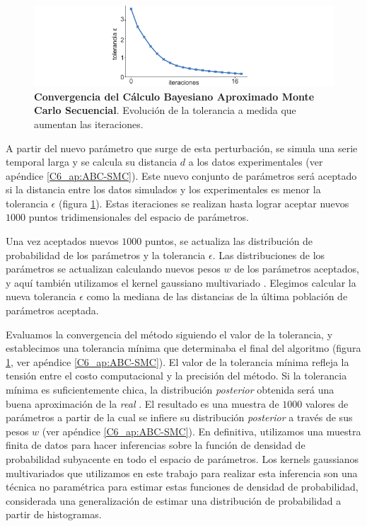 \documentclass[./main.tex]{subfiles}
\begin{document}
\begin{figure}
    \centering
    \includegraphics[width=1\columnwidth]{figures/chapter6/C6_eps.pdf} 
    \caption{\textbf{Convergencia del  Cálculo Bayesiano Aproximado Monte Carlo Secuencial}. Evolución de la tolerancia a medida que aumentan las iteraciones.}
    \label{C6_fig:eps}
\end{figure} 


A partir del nuevo parámetro que surge de esta perturbación, se simula una serie temporal larga y se calcula su distancia $d$ a los datos experimentales (ver apéndice \ref{C6_ap:ABC-SMC}). Este nuevo conjunto de parámetros será aceptado si la distancia entre los datos simulados y los experimentales es menor la tolerancia $\epsilon$ (figura \ref{C6_fig:eps}). Estas iteraciones se realizan hasta lograr aceptar nuevos $1000$ puntos tridimensionales del espacio de parámetros. 


Una vez aceptados nuevos $1000$ puntos, se actualiza las distribución de probabilidad de los parámetros y la tolerancia $\epsilon$. Las distribuciones de los parámetros se actualizan calculando nuevos pesos $w$ de los parámetros aceptados, y aquí también utilizamos el kernel gaussiano multivariado \cite{Toni2009}. Elegimos calcular la nueva tolerancia $\epsilon$ como la mediana de las distancias de la última población de parámetros aceptada. 


Evaluamos la convergencia del método siguiendo el valor de la tolerancia, y establecimos una tolerancia mínima que determinaba el final del algoritmo \cite{Costa2021} (figura \ref{C6_fig:eps}, ver apéndice \ref{C6_ap:ABC-SMC}). El valor de la tolerancia mínima refleja la tensión entre el costo computacional y la precisión del método. Si la tolerancia mínima es suficientemente chica, la distribución \textit{posterior} obtenida será una buena aproximación de la \emph{real} \cite{Toni2010}. El resultado es una muestra de $1000$ valores de parámetros a partir de la cual se infiere su distribución \textit{posterior} a través de sus pesos $w$ (ver apéndice \ref{C6_ap:ABC-SMC}). En definitiva, utilizamos una muestra finita de datos para hacer inferencias sobre la función de densidad de probabilidad subyacente en todo el espacio de parámetros. Los kernels gaussianos multivariados que utilizamos en este trabajo para realizar esta inferencia son una técnica no paramétrica para estimar estas funciones de densidad de probabilidad, considerada una generalización de estimar una distribución de probabilidad a partir de histogramas. 
\end{document}
